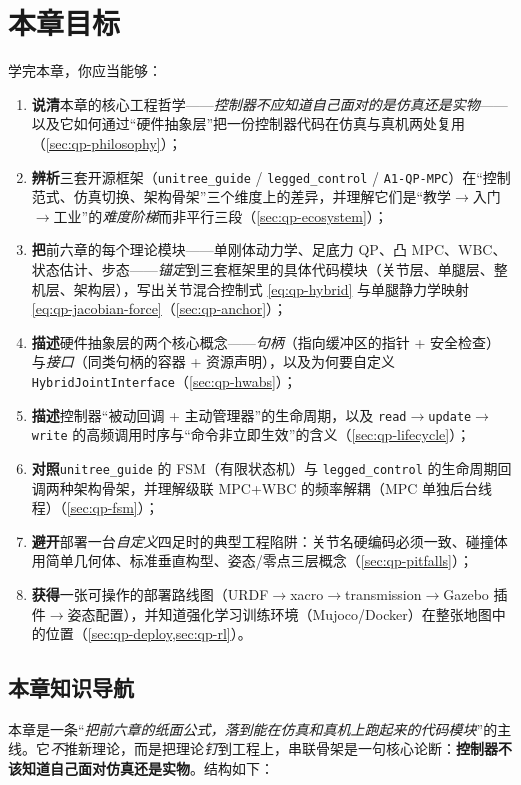 \section*{本章目标}
学完本章，你应当能够：
\begin{enumerate}
  \item \textbf{说清}本章的核心工程哲学——\emph{控制器不应知道自己面对的是仿真还是实物}——以及它如何通过“硬件抽象层”把一份控制器代码在仿真与真机两处复用（\cref{sec:qp-philosophy}）；
  \item \textbf{辨析}三套开源框架（\texttt{unitree\_guide} / \texttt{legged\_control} / \texttt{A1-QP-MPC}）在“控制范式、仿真切换、架构骨架”三个维度上的差异，并理解它们是“教学$\to$入门$\to$工业”的\emph{难度阶梯}而非平行三段（\cref{sec:qp-ecosystem}）；
  \item \textbf{把}前六章的每个理论模块——单刚体动力学、足底力 QP、凸 MPC、WBC、状态估计、步态——\emph{锚定}到三套框架里的具体代码模块（关节层、单腿层、整机层、架构层），写出关节混合控制式 \cref{eq:qp-hybrid} 与单腿静力学映射 \cref{eq:qp-jacobian-force}（\cref{sec:qp-anchor}）；
  \item \textbf{描述}硬件抽象层的两个核心概念——\emph{句柄}（指向缓冲区的指针 + 安全检查）与\emph{接口}（同类句柄的容器 + 资源声明），以及为何要自定义 \texttt{HybridJointInterface}（\cref{sec:qp-hwabs}）；
  \item \textbf{描述}控制器“被动回调 + 主动管理器”的生命周期，以及 \texttt{read}$\to$\texttt{update}$\to$\texttt{write} 的高频调用时序与“命令非立即生效”的含义（\cref{sec:qp-lifecycle}）；
  \item \textbf{对照}\texttt{unitree\_guide} 的 FSM（有限状态机）与 \texttt{legged\_control} 的生命周期回调两种架构骨架，并理解级联 MPC+WBC 的频率解耦（MPC 单独后台线程）（\cref{sec:qp-fsm}）；
  \item \textbf{避开}部署一台\emph{自定义}四足时的典型工程陷阱：关节名硬编码必须一致、碰撞体用简单几何体、标准垂直构型、姿态/零点三层概念（\cref{sec:qp-pitfalls}）；
  \item \textbf{获得}一张可操作的部署路线图（URDF$\to$xacro$\to$transmission$\to$Gazebo 插件$\to$姿态配置），并知道强化学习训练环境（Mujoco/Docker）在整张地图中的位置（\cref{sec:qp-deploy,sec:qp-rl}）。
\end{enumerate}

\subsection*{本章知识导航}
本章是一条“\emph{把前六章的纸面公式，落到能在仿真和真机上跑起来的代码模块}”的主线。它\emph{不}推新理论，而是把理论\emph{钉}到工程上，串联骨架是一句核心论断：\textbf{控制器不该知道自己面对仿真还是实物}。结构如下：

